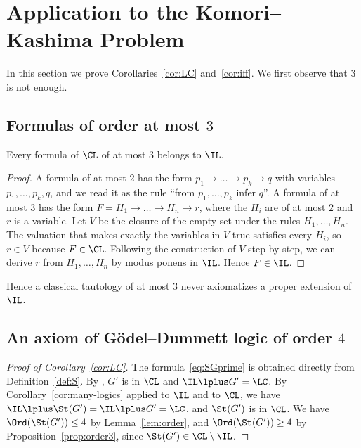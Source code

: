 \section{Application to the Komori--Kashima Problem}\label{sec:kk}

In this section we prove Corollaries~\ref{cor:LC} and~\ref{cor:iff}.
We first observe that  $3$ is not enough.

\subsection{Formulas of order at most \texorpdfstring{$3$}{3}}

\begin{proposition}\label{prop:order3}
Every formula of $\CL$ of  at most $3$ belongs to $\IL$.
\end{proposition}
\begin{proof}
A formula of  at most $2$ has the form $p_1\to\dots\to p_k\to q$ with
variables $p_1,\dots,p_k,q$, and we read it as the rule ``from
$p_1,\dots,p_k$ infer $q$''. A formula of  at most $3$ has the form
$F=H_1\to\dots\to H_n\to r$, where the $H_i$ are of  at most $2$ and
$r$ is a variable. Let $V$ be the closure of the empty set under the rules
$H_1,\dots,H_n$. The valuation that makes exactly the variables in $V$ true
satisfies every $H_i$, so $r\in V$ because $F\in\CL$. Following the
construction of $V$ step by step, we can derive $r$ from $H_1,\dots,H_n$ by
modus ponens in $\IL$. Hence $F\in\IL$.
\end{proof}

Hence a classical tautology of  at most $3$ never axiomatizes a
proper extension of $\IL$.

\subsection{An axiom of Gödel--Dummett logic of order \texorpdfstring{$4$}{4}}


\begin{proof}[Proof of Corollary~\ref{cor:LC}]
The formula~\eqref{eq:SGprime} is obtained directly from
Definition~\ref{def:S}. By \cite[Lemma~4.2]{NM21}, $G'$ is  in $\CL$ and $\IL\lplus G'=\LC$.
By Corollary~\ref{cor:many-logics} applied to $\IL$ and to $\CL$, we have
$\IL\lplus\St(G')=\IL\lplus G'=\LC$, and $\St(G')$ is  in
$\CL$. We have $\Ord(\St(G'))\le4$ by Lemma~\ref{lem:order}, and
$\Ord(\St(G'))\ge4$ by Proposition~\ref{prop:order3}, since
$\St(G')\in\CL\setminus\IL$.
\end{proof}


